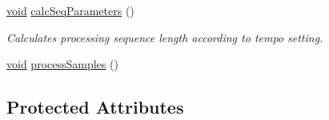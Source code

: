\begin{DoxyCompactItemize}
\item 
\hyperlink{sound_8c_ae35f5844602719cf66324f4de2a658b3}{void} \hyperlink{classsoundtouch_1_1_t_d_stretch_a189b5f64b1955ad20b8cc11566b260d5}{calc\+Seq\+Parameters} ()
\begin{DoxyCompactList}\small\item\em Calculates processing sequence length according to tempo setting. \end{DoxyCompactList}\item 
\hyperlink{sound_8c_ae35f5844602719cf66324f4de2a658b3}{void} \hyperlink{classsoundtouch_1_1_t_d_stretch_aec10746c3fc5c6b0b41d1adddac0dbd1}{process\+Samples} ()
\end{DoxyCompactItemize}
\subsection*{Protected Attributes}
